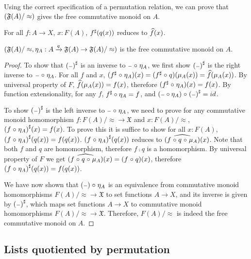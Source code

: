 Using the correct specification of a permutation relation, we can prove that $({\mathfrak{F}(A) / \approx})$ gives the free
commutative monoid on $A$.

\begin{lemma}
    For all $f : A \to X$, $x : F(A)$, ${f}^{\sharp}(q(x))$ reduces to $\widehat{f}(x)$.
\end{lemma}

\begin{proposition}
    $({\mathfrak{F}(A) / \approx},\eta_A : A \xrightarrow{q} \mathfrak{F}(A) \to {\mathfrak{F}(A) / \approx})$
    is the free commutative monoid on $A$.
\end{proposition}

\begin{proof}
    To show that ${({\scriptstyle{-}})}^{\sharp}$ is an inverse to ${\scriptstyle{-}} \mathrel{\circ} \eta_A$,
    we first show ${({\scriptstyle{-}})}^{\sharp}$ is the right inverse to ${\scriptstyle{-}} \mathrel{\circ} \eta_A$.
    For all $f$ and $x$, $({f}^{\sharp} \mathrel{\circ} \eta_A)(x) = ({f}^{\sharp} \mathrel{\circ} q)(\mu_A(x)) = \widehat{f}(\mu_A(x))$.
    By universal property of $F$, $\widehat{f}(\mu_A(x)) = f(x)$, therefore $({f}^{\sharp} \mathrel{\circ} \eta_A)(x) = f(x)$.
    By function extensionality, for any $f$, ${f}^{\sharp} \circ \eta_A = f$,
    and $({\scriptstyle{-}} \circ \eta_A) \mathrel{\circ} {({\scriptstyle{-}})}^{\sharp} = id$.

    To show ${({\scriptstyle{-}})}^{\sharp}$ is the left inverse to ${\scriptstyle{-}} \mathrel{\circ} \eta_A$, we need to prove
    for any commutative monoid homomorphism $f : {F(A) / \approx} \to \mathfrak{X}$ and $x : {F(A) / \approx}$,
    ${(f \mathrel{\circ} \eta_A)}^{\sharp}(x) = f(x)$. To prove this it is suffice to show for all $x : F(A)$,
    ${(f \mathrel{\circ} \eta_A)}^{\sharp}(q(x)) = f(q(x))$.
    ${(f \mathrel{\circ} \eta_A)}^{\sharp}(q(x))$ reduces to $\widehat{(f \mathrel{\circ} q \mathrel{\circ} \mu_A)}(x)$.
    Note that both $f$ and $q$ are homomorphism, therefore $f \comp q$ is a homomorphism. By
    universal property of $F$ we get $\widehat{(f \mathrel{\circ} q \mathrel{\circ} \mu_A)}(x) = (f \mathrel{\circ} q)(x)$,
    therefore ${(f \mathrel{\circ} \eta_A)}^{\sharp}(q(x)) = f(q(x))$.

    We have now shown that $({\scriptstyle{-}}) \mathrel{\circ} \eta_A$ is an equivalence from
    commutative monoid homomorphisms ${F(A) / \approx} \to \mathfrak{X}$
    to set functions $A \to X$, and its inverse is given by ${({\scriptstyle{-}})}^{\sharp}$, which maps set
    functions $A \to X$ to commutative monoid homomorphisms ${F(A) / \approx} \to \mathfrak{X}$.
    Therefore, ${F(A) / \approx}$ is indeed the free commutative monoid on $A$.
\end{proof}


\subsection{Lists quotiented by permutation}\label{cmon:plist}

